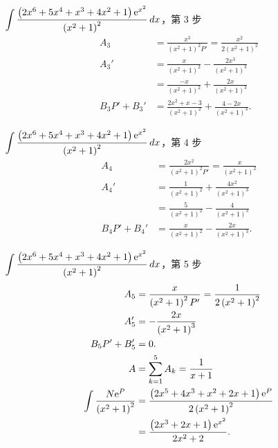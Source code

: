 \documentclass{beamer}
\newcommand{\e}{\textup e}
\theoremstyle{remark}
\begin{document}
\begin{CJK}{UTF8}{bsmi}
\begin{frame}{$\displaystyle \int \frac{\left( 2x^6 + 5x^4 + x^3 + 4x^2 + 1 \right) \e^{x^2}}{\left( x^2 + 1 \right)^2}
    \,dx$，第 3 步}
  \begin{align*}
    A_3  &= \frac{x^3}{\left( x^2 + 1 \right)^2 P'} = \frac{x^2}{2 \left( x^2 + 1 \right)^2}\\
    A_3' &= \frac{x}{\left( x^2 + 1 \right)^2} - \frac{2x^3}{\left( x^2 + 1 \right)^3}\\
         &= \frac{-x}{\left( x^2 + 1 \right)^2} + \frac{2x}{\left( x^2 + 1 \right)^3}\\
    B_3 P' + B_3' &= \frac{2x^2 + x - 3}{\left( x^2 + 1 \right)^2} + \frac{4 - 2x}{\left( x^2 + 1 \right)^3}.
  \end{align*}
\end{frame}

\begin{frame}{$\displaystyle \int \frac{\left( 2x^6 + 5x^4 + x^3 + 4x^2 + 1 \right) \e^{x^2}}{\left( x^2 + 1 \right)^2}
    \,dx$，第 4 步}
  \begin{align*}
    A_4  &= \frac{2x^2}{\left( x^2 + 1 \right)^2 P'} = \frac{x}{\left( x^2 + 1 \right)^2}\\
    A_4' &= \frac{1}{\left( x^2 + 1 \right)^2} + \frac{4x^2}{\left( x^2 + 1 \right)^3}\\
         &= \frac{5}{\left( x^2 + 1 \right)^2} - \frac{4}{\left( x^2 + 1 \right)^3}\\
    B_4 P' + B_4' &= \frac{x}{\left( x^2 + 1 \right)^2} - \frac{2x}{\left( x^2 + 1 \right)^3}.
  \end{align*}
\end{frame}

\begin{frame}{$\displaystyle \int \frac{\left( 2x^6 + 5x^4 + x^3 + 4x^2 + 1 \right) \e^{x^2}}{\left( x^2 + 1 \right)^2}
    \,dx$，第 5 步}
  \begin{align*}
    A_5  &= \frac{x}{\left( x^2 + 1 \right)^2 P'} = \frac{1}{2 \left( x^2 + 1 \right)^2}\\
    A_5' &= -\frac{2x}{\left( x^2 + 1 \right)^3}\\
    B_5 P' + B_5' &= 0.\\
    A &= \sum_{k=1}^5 A_k = \frac{1}{x+1}\\
    \int \frac{N \e^P}{\left( x^2 + 1 \right)^2}
        &= \frac{\left( 2x^5 + 4x^3 + x^2 + 2x + 1 \right) \e^P}{2 \left( x^2 + 1 \right)^2}\\
        &= \frac{\left( 2x^3 + 2x + 1 \right) \e^{x^2}}{2x^2 + 2}.
  \end{align*}
\end{frame}


\end{CJK}
\end{document}
